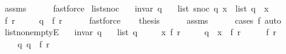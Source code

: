 \begin{isabellebody}
\ assms\isanewline
\ \ \ \ \isamarkupfalse%
\ fastforce\isanewline
{}\isamarkupfalse%
%
\endisatagproof
{\isafoldproof}%
%
\isadelimproof
\isanewline
%
\endisadelimproof
\isanewline
{}\isamarkupfalse%
\ list{\isacharunderscore}{\kern0pt}snoc{\isacharcolon}{\kern0pt}\isanewline
\ \ \ {\isachardoublequoteopen}invar\ q{\isachardoublequoteclose}\isanewline
\ \ \ {\isachardoublequoteopen}list\ {\isacharparenleft}{\kern0pt}snoc\ q\ x{\isacharparenright}{\kern0pt}\ {\isacharequal}{\kern0pt}\ list\ q\ {\isacharat}{\kern0pt}\ {\isacharbrackleft}{\kern0pt}x{\isacharbrackright}{\kern0pt}{\isachardoublequoteclose}\isanewline
%
\isadelimproof
%
\endisadelimproof
%
\isatagproof
{}\isamarkupfalse%
\ {\isacharminus}{\kern0pt}\isanewline
\ \ \isamarkupfalse%
\ f\ r\ \isanewline
\ \ \ \ {\isachardoublequoteopen}q\ {\isacharequal}{\kern0pt}\ {\isacharparenleft}{\kern0pt}f{\isacharcomma}{\kern0pt}\ r{\isacharparenright}{\kern0pt}{\isachardoublequoteclose}\isanewline
\ \ \ \ \isamarkupfalse%
\ fastforce\isanewline
\ \ \isamarkupfalse%
\ {\isacharquery}{\kern0pt}thesis\isanewline
\ \ \ \ \isamarkupfalse%
\ assms\isanewline
\ \ \ \ \isamarkupfalse%
\ {\isacharparenleft}{\kern0pt}cases\ f{\isacharparenright}{\kern0pt}\ auto\isanewline
{}\isamarkupfalse%
%
\endisatagproof
{\isafoldproof}%
%
\isadelimproof
\isanewline
%
\endisadelimproof
\isanewline
{}\isamarkupfalse%
\ list{\isacharunderscore}{\kern0pt}non{\isacharunderscore}{\kern0pt}emptyE{\isacharcolon}{\kern0pt}\isanewline
\ \ \ {\isachardoublequoteopen}invar\ q{\isachardoublequoteclose}\isanewline
\ \ \ {\isachardoublequoteopen}list\ q\ {\isasymnoteq}\ {\isacharbrackleft}{\kern0pt}{\isacharbrackright}{\kern0pt}{\isachardoublequoteclose}\isanewline
\ \ \ x\ f\ r\ \isanewline
\ \ \ \ {\isachardoublequoteopen}q\ {\isacharequal}{\kern0pt}\ {\isacharparenleft}{\kern0pt}x\ {\isacharhash}{\kern0pt}\ f{\isacharcomma}{\kern0pt}\ r{\isacharparenright}{\kern0pt}{\isachardoublequoteclose}\isanewline
%
\isadelimproof
%
\endisadelimproof
%
\isatagproof
{}\isamarkupfalse%
\ {\isacharminus}{\kern0pt}\isanewline
\ \ \isamarkupfalse%
\ f\ r\ \isanewline
\ \ \ \ q{\isacharcolon}{\kern0pt}\ {\isachardoublequoteopen}q\ {\isacharequal}{\kern0pt}\ {\isacharparenleft}{\kern0pt}f{\isacharcomma}{\kern0pt}\ r{\isacharparenright}{\kern0pt}{\isachardoublequoteclose}\isanewline

\end{isabellebody}
